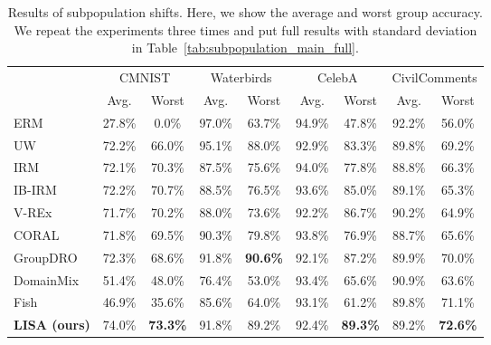 \begin{table*}[h]
\small
\caption{Results of subpopulation shifts. Here, we show the average and worst group accuracy. We repeat the experiments three times and put full results with standard deviation in Table~\ref{tab:subpopulation_main_full}.}
\label{tab:subpopulation_main}
\begin{center}
\begin{tabular}{l|cc|cc|cc|cc}
\toprule
\multirow{2}{*}{} & \multicolumn{2}{c|}{CMNIST} & \multicolumn{2}{c|}{Waterbirds} & \multicolumn{2}{c|}{CelebA} & \multicolumn{2}{c}{CivilComments} \\
& Avg. & Worst  & Avg. & Worst  & Avg. & Worst & Avg. & Worst \\\midrule
ERM & 27.8\% & 0.0\% & 97.0\% & 63.7\% & 94.9\% & 47.8\% & 92.2\% & 56.0\% \\
UW  & 72.2\% & 66.0\% &  95.1\% & 88.0\% & 92.9\% & 83.3\% & 89.8\% & 69.2\% \\
IRM & 72.1\% & 70.3\% & 87.5\% & 75.6\% & 94.0\% & 77.8\% & 88.8\% & 66.3\% \\
IB-IRM & 72.2\% & 70.7\% & 88.5\% & 76.5\% & 93.6\% & 85.0\% & 89.1\% & 65.3\%\\
V-REx & 71.7\% & 70.2\% & 88.0\% & 73.6\% & 92.2\% & 86.7\% &  90.2\% & 64.9\% \\
CORAL & 71.8\% & 69.5\% & 90.3\% & 79.8\% & 93.8\% & 76.9\% & 88.7\% & 65.6\% \\
GroupDRO & 72.3\% & 68.6\% & 91.8\% & \textbf{90.6\%} & 92.1\% & 87.2\% & 89.9\% & 70.0\%  \\
DomainMix & 51.4\% & 48.0\% & 76.4\% & 53.0\% & 93.4\% & 65.6\% & 90.9\% & 63.6\%\\
Fish & 46.9\% & 35.6\% & 85.6\% & 64.0\% & 93.1\% & 61.2\% &  89.8\% & 71.1\% \\
\midrule
\textbf{LISA (ours)} & 74.0\% & \textbf{73.3\%} & 91.8\% & 89.2\% & 92.4\% & \textbf{89.3\%} & 89.2\% &  \textbf{72.6\%} \\
\bottomrule
\end{tabular}
\end{center}
\vspace{-2em}
\end{table*}

